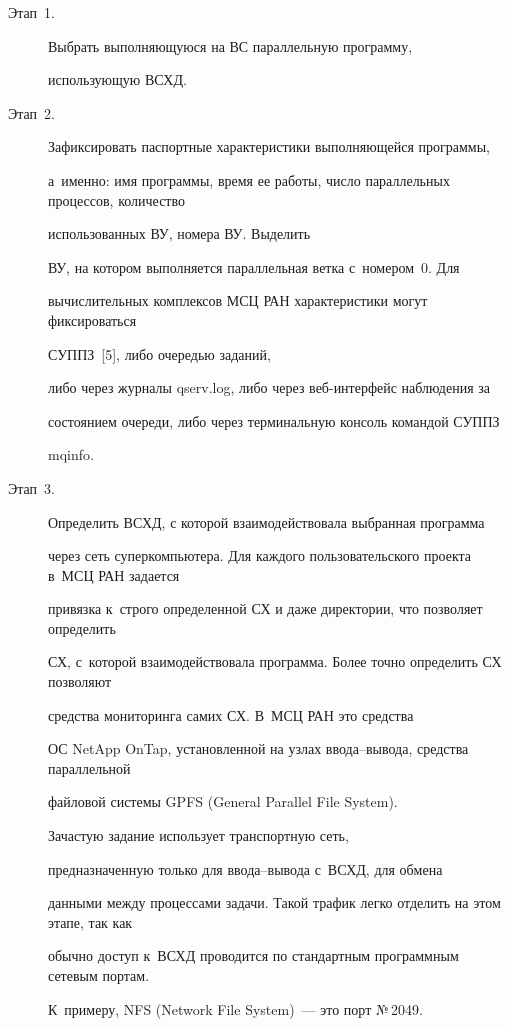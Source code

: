 \begin{description}


\item[Этап~1.] Выбрать выполняющуюся на ВС параллельную программу,


использующую ВСХД.


\item[Этап~2.] Зафиксировать паспортные характеристики выполняющейся программы,


а~именно: имя программы, время ее работы, число параллельных процессов, количество


использованных ВУ, номера ВУ. Выделить


ВУ, на котором выполняется параллельная ветка с~номером~0. Для


вы\-чис\-ли\-тель\-ных комплексов МСЦ РАН характеристики могут фиксироваться


\mbox{СУППЗ}~[5], либо очередью заданий,


либо через журналы {\sf qserv.log}, либо через веб-ин\-тер\-фейс наблюдения за


состоянием очереди, либо через терминальную консоль командой \mbox{СУППЗ}


{\sf mqinfo}.


      \item[Этап~3.] Определить ВСХД, с которой взаимодействовала выбранная программа


через сеть суперкомпьютера. Для каждого пользовательского проекта в~МСЦ РАН задается


привязка к~строго определенной СХ и даже директории, что позволяет определить


СХ, с~которой взаимодействовала программа. Более точно определить СХ позволяют


средства мониторинга самих СХ. В~МСЦ РАН это средства


ОС \mbox{NetApp} OnTap, установленной на узлах вво\-да--вы\-во\-да, средства параллельной


файловой системы GPFS (General Parallel File System).


Зачастую задание использует транспортную сеть,


предназначенную только для вво\-да--вы\-во\-да с~ВСХД, для обмена


данными между процессами задачи. Такой трафик легко отделить на этом этапе, так как


обычно доступ к~ВСХД проводится по стандартным программным сетевым портам.


К~примеру, NFS (Network File System)~--- это порт №\,2049.



\end{description}
